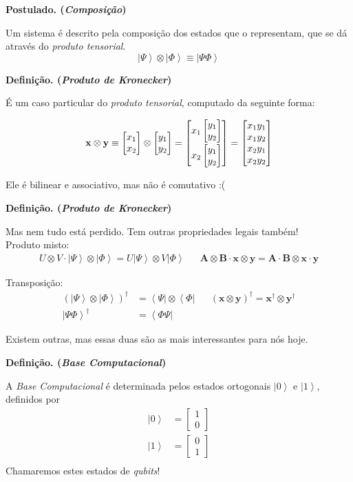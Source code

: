 \documentclass[t]{beamer}
\newcommand{\postulado}[1]{%
	\textbf{Postulado. (\emph{#1})\\}
}
\newcommand{\definicao}[1]{%
	\textbf{Definição. (\emph{#1})\\}
}
\newcommand{\vetor}[2]{\ensuremath{
\left[\begin{matrix}
#1 \\
#2
\end{matrix}\right]
}
}
\newcommand{\vetorx}[4]{\ensuremath{
\left[\begin{matrix}
#1 \\
#2 \\
#3 \\
#4
\end{matrix}\right]
}
}
\newcommand{\ket}[1]{\ensuremath{\left|#1\right\rangle}}
\newcommand{\bra}[1]{\ensuremath{\left\langle#1\right|}}
\begin{document}
	\begin{frame}{\subsecname}
		\postulado{Composição}
		Um sistema é descrito pela composição dos estados que o representam, que se dá através do \emph{produto tensorial}.
		$$\ket{\Psi} \otimes \ket{\Phi} \equiv \ket{\Psi\Phi}$$
	\end{frame}
	
	\begin{frame}{\subsecname}
		\definicao{Produto de Kronecker}
		
		É um caso particular do \emph{produto tensorial}, computado da seguinte forma:
		
		\begin{align*}
		\mathbf{x} \otimes \mathbf{y} \equiv \vetor{x_1}{x_2} \otimes \vetor{y_1}{y_2} = \vetor{x_1 \vetor{y_1}{y_2} \vspace{2pt}}{x_2 \vetor{y_1}{y_2}} = \vetorx{x_1 y_1}{x_1 y_2}{x_2 y_1 }{x_2 y_2}
		\end{align*}
		
		Ele é bilinear e associativo, mas não é comutativo :(\\
	\end{frame}
	
	\begin{frame}{\subsecname}
		\definicao{Produto de Kronecker}
		
		Mas nem tudo está perdido. Tem outras propriedades legais também!\\
		
		Produto misto:
		\begin{align*}
			U \otimes V \cdot \ket{\Psi} \otimes \ket{\Phi} = U \ket{\Psi} \otimes V \ket{\Phi} && \mathbf{A} \otimes \mathbf{B} \cdot \mathbf{x} \otimes \mathbf{y} = \mathbf{A} \cdot \mathbf{B} \otimes \mathbf{x} \cdot \mathbf{y}
		\end{align*}
		
		Transposição:
		\begin{align*}
			(\ket{\Psi} \otimes \ket{\Phi})^\dagger &= \bra{\Psi} \otimes \bra{\Phi} && (\mathbf{x} \otimes \mathbf{y})^\dagger = \mathbf{x}^\dagger \otimes \mathbf{y}^\dagger\\
			\ket{\Psi\Phi}^\dagger &= \bra{\Phi\Psi} &&
		\end{align*}
		
		Existem outras, mas essas duas são as mais interessantes para nós hoje.
	\end{frame}
	
	\begin{frame}{\subsecname}
		\definicao{Base Computacional}
		A \emph{Base Computacional} é determinada pelos estados ortogonais $\ket{0}$ e $\ket{1}$, definidos por
		\begin{align*}
		\ket{0} &= \vetor{1}{0}\\
		\ket{1} &= \vetor{0}{1}\\
		\end{align*}
		Chamaremos estes estados de \textit{qubits}!
	\end{frame}
	
\end{document}
